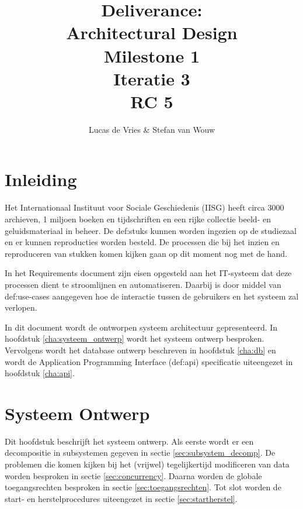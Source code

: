 \documentclass[a4paper,titlepage]{report}
\title{Deliverance:\\ Architectural Design\\ Milestone 1\\ Iteratie 3\\ RC 5}
\author{Lucas de Vries \& Stefan van Wouw}
\begin{document}
\maketitle


\setcounter{secnumdepth}{5}
\setcounter{tocdepth}{2}

\tableofcontents
\pagebreak

\chapter{Inleiding}
Het Internationaal Instituut voor Sociale Geschiedenis (IISG) heeft circa 3000
archieven, 1 miljoen boeken en tijdschriften en een rijke collectie beeld- en
geluidsmateriaal in beheer. De \glspl{def:stuk} kunnen worden ingezien op de
studiezaal en er kunnen reproducties worden besteld. De processen die bij het
inzien en reproduceren van stukken komen kijken gaan op dit moment nog met de
hand. 

In het Requirements document zijn eisen opgesteld aan het IT-systeem dat deze
processen dient te stroomlijnen en automatiseren. Daarbij is door middel van
\glspl{def:use-case} aangegeven hoe de interactie tussen de gebruikers en het
systeem zal verlopen.

In dit document wordt de ontworpen systeem architectuur gepresenteerd. In
hoofdstuk \ref{cha:systeem_ontwerp} wordt het systeem ontwerp besproken.
Vervolgens wordt het database ontwerp beschreven in hoofdstuk \ref{cha:db} en
wordt de Application Programming Interface (\gls{def:api}) specificatie uiteengezet in
hoofdstuk \ref{cha:api}.

\chapter{Systeem Ontwerp}
Dit hoofdstuk beschrijft het systeem ontwerp. Als eerste wordt er een
decompositie in subsystemen gegeven in sectie \ref{sec:subsystem_decomp}. De
problemen die komen kijken bij het (vrijwel)
tegelijkertijd modificeren van data worden besproken in sectie
\ref{sec:concurrency}. Daarna worden de globale toegangsrechten besproken in
sectie \ref{sec:toegangsrechten}. Tot slot worden de start- en
herstelprocedures uiteengezet in sectie \ref{sec:startherstel}.


\label{cha:systeem_ontwerp}
\end{document}
